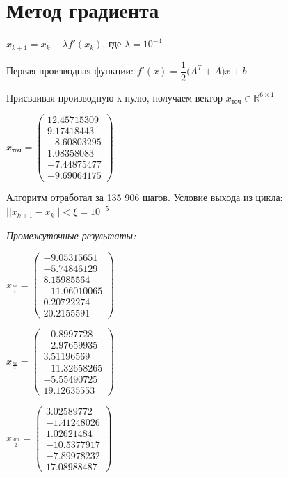 \documentclass[a4paper, 14pt]{extarticle}
\begin{document}
	\section{Метод градиента}
		$x_{k+1} = x_k - \lambda f'(x_k)$, где $\lambda = 10^{-4}$
		
		Первая производная функции: $ f'(x) = \dfrac{1}{2}\big(A^T + A\big)x + b $
		
		Присваивая производную к нулю, получаем вектор $x_{\text{точ}} \in \mathbb{R}^{6\times1}$
		
		$x_{\text{точ}} = \begin{pmatrix}
			12.45715309\\
			 9.17418443\\
			-8.60803295\\
			 1.08358083\\
			-7.44875477\\
			-9.69064175
		\end{pmatrix}$
		
		 Алгоритм отработал за 135 906 шагов. Условие выхода из цикла: $ || x_{k+1} - x_k || < \xi = 10^{-5} $
		 
		\textit{Промежуточные результаты:}
		 
		 $x_{\frac{m}{4}} = \begin{pmatrix}
		 	-9.05315651\\
		 	-5.74846129\\
		 	8.15985564\\
		 	-11.06010065\\
		 	0.20722274\\
		 	20.2155591
		 \end{pmatrix} $
	 
		 $x_{\frac{m}{2}} = \begin{pmatrix}
		 	-0.8997728\\
		 	-2.97659935\\
		 	3.51196569\\
		 	-11.32658265\\
		 	-5.55490725\\
		 	19.12635553
		 \end{pmatrix} $
	 
	 $x_{\frac{3m}{2}} = \begin{pmatrix}
	 	3.02589772\\
	 	-1.41248026\\
	 	1.02621484\\
	 	-10.5377917\\
	 	-7.89978232\\
	 	17.08988487
	 \end{pmatrix} $
 
\end{document}
